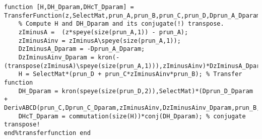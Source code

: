 \documentclass{article}
\begin{document}
\begin{verbatim}
function [H,DH_Dparam,DHcT_Dparam] = TransferFunction(z,SelectMat,prun_A,prun_B,prun_C,prun_D,Dprun_A_Dparam,Dprun_B_Dparam,Dprun_C_Dparam,Dprun_D_Dparam)
    % Compute H and DH_Dparam and its conjugate(!) transpose.
    zIminusA =  (z*speye(size(prun_A,1)) - prun_A);
    zIminusAinv = zIminusA\speye(size(prun_A,1));
    DzIminusA_Dparam = -Dprun_A_Dparam;
    DzIminusAinv_Dparam = kron(-(transpose(zIminusA)\speye(size(prun_A,1))),zIminusAinv)*DzIminusA_Dparam;
    H = SelectMat*(prun_D + prun_C*zIminusAinv*prun_B); % Transfer function
    DH_Dparam = kron(speye(size(prun_D,2)),SelectMat)*(Dprun_D_Dparam + DerivABCD(prun_C,Dprun_C_Dparam,zIminusAinv,DzIminusAinv_Dparam,prun_B,Dprun_B_Dparam));
    DHcT_Dparam = commutation(size(H))*conj(DH_Dparam); % conjugate transpose!
end%transferfunction end
\end{verbatim}
\end{document}
